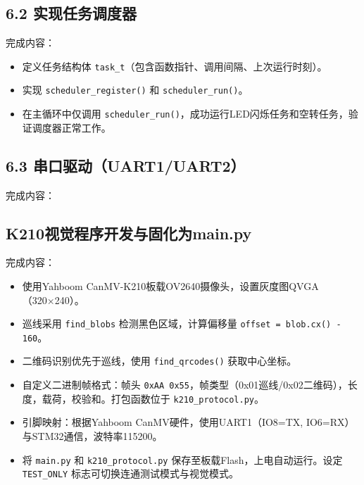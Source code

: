 \documentclass{article}
\begin{document}
\subsection{6.2 实现任务调度器}
完成内容：
\begin{itemize}
    \item 定义任务结构体 \texttt{task\_t}（包含函数指针、调用间隔、上次运行时刻）。
    \item 实现 \texttt{scheduler\_register()} 和 \texttt{scheduler\_run()}。
    \item 在主循环中仅调用 \texttt{scheduler\_run()}，成功运行LED闪烁任务和空转任务，验证调度器正常工作。
\end{itemize}

\subsection{6.3 串口驱动（UART1/UART2）}
完成内容：

\subsection{K210视觉程序开发与固化为main.py}
完成内容：
\begin{itemize}
    \item 使用Yahboom CanMV-K210板载OV2640摄像头，设置灰度图QVGA（320×240）。
    \item 巡线采用 \texttt{find\_blobs} 检测黑色区域，计算偏移量 \texttt{offset = blob.cx() - 160}。
    \item 二维码识别优先于巡线，使用 \texttt{find\_qrcodes()} 获取中心坐标。
    \item 自定义二进制帧格式：帧头 \texttt{0xAA 0x55}，帧类型（0x01巡线/0x02二维码），长度，载荷，校验和。打包函数位于 \texttt{k210\_protocol.py}。
    \item 引脚映射：根据Yahboom CanMV硬件，使用UART1（IO8=TX, IO6=RX）与STM32通信，波特率115200。
    \item 将 \texttt{main.py} 和 \texttt{k210\_protocol.py} 保存至板载Flash，上电自动运行。设定 \texttt{TEST\_ONLY} 标志可切换连通测试模式与视觉模式。
\end{itemize}
\end{document}
